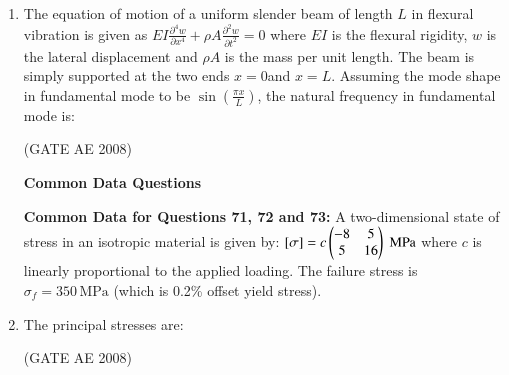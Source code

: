 \documentclass[journal,12pt,onecolumn]{IEEEtran}
\theoremstyle{remark}
\begin{document}
\begin{enumerate}
\quad 

\item  The equation of motion of a uniform slender beam of length \( L \) in flexural vibration is given as
$
EI \frac{\partial^4 w}{\partial x^4} + \rho A \frac{\partial^2 w}{\partial t^2} = 0
$
where $EI$ is the flexural rigidity, $w$ is the lateral displacement and $ \rho A $ is the mass per unit length.  
The beam is simply supported at the two ends $x = 0 $and $x = L $.  
Assuming the mode shape in fundamental mode to be $ \sin\left( \frac{\pi x}{L} \right) $,  
the natural frequency in fundamental mode is:

\begin{enumerate}
\end{enumerate}
\hfill(GATE AE 2008)

\quad 

\textbf{Common Data Questions}  

\quad

\textbf{Common Data for Questions 71, 72 and 73:}  
A two-dimensional state of stress in an isotropic material is given by:
$
[\sigma] = c 
\begin{pmatrix}
-8 & 5 \\
5 & 16
\end{pmatrix} \; \text{MPa}
$
where $c$ is linearly proportional to the applied loading.  
The failure stress is $ \sigma_f = 350 \, \text{MPa}$ (which is 0.2\% offset yield stress).

\item The principal stresses are:  

\begin{enumerate}
\end{enumerate}
\hfill(GATE AE 2008)


\end{enumerate}
\end{document}
